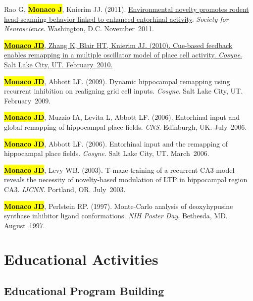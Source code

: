 \documentclass[10pt]{article}
\newcommand{\itemtitle}[1]{{\color{hopkinsblue}\ul{#1}}}
\newcommand{\unpubtitle}[1]{{\color{hopkinsblue} #1}}
\newcommand{\joehl}[1]{\hl{\textbf{#1}}}
\begin{document}
\begin{description}
    {Rao G, \joehl{Monaco J}, Knierim JJ. (2011). \itemtitle{Environmental
        novelty promotes rodent head-scanning behavior linked to enhanced entorhinal
      activity}. \emph{Society for Neuroscience}. Washington,
    D.C. November~2011.}
  \item[\quad]
    \href{https://www.frontiersin.org/10.3389/conf.fnins.2010.03.00192/event_abstract}
    {\joehl{Monaco JD}, Zhang K, Blair HT, Knierim JJ. (2010).
    \itemtitle{Cue-based feedback enables remapping in a multiple oscillator
      model of place cell activity}. \emph{Cosyne}. Salt Lake City, UT.
    February~2010.}
  \item[\quad] \joehl{Monaco JD}, Abbott LF. (2009). \unpubtitle{Dynamic
      hippocampal remapping using recurrent inhibition on realigning grid cell
    inputs}. \emph{Cosyne}. Salt Lake City, UT. February~2009.
  \item[\quad] \joehl{Monaco JD}, Muzzio IA, Levita L, Abbott LF. (2006).
    \unpubtitle{Entorhinal input and global remapping of hippocampal place
    fields}. \emph{CNS}. Edinburgh, UK. July~2006.
  \item[\quad] \joehl{Monaco JD}, Abbott LF. (2006). \unpubtitle{Entorhinal
    input and the remapping of hippocampal place fields}. \emph{Cosyne}. Salt Lake
    City, UT. March~2006.
  \item[\quad] \joehl{Monaco JD}, Levy WB. (2003). \unpubtitle{T-maze training
      of a recurrent CA3 model reveals the necessity of novelty-based modulation of
    LTP in hippocampal region CA3}. \emph{IJCNN}. Portland, OR. July~2003.
  \item[\quad] \joehl{Monaco JD}, Perlstein RP. (1997). \unpubtitle{Monte-Carlo
      analysis of deoxyhypusine synthase inhibitor ligand conformations}. \emph{NIH
    Poster Day}. Bethesda, MD. August~1997.
\end{description}

\section*{Educational Activities}
\subsection*{Educational Program Building}
\label{sec:eduprogram}
\end{document}
